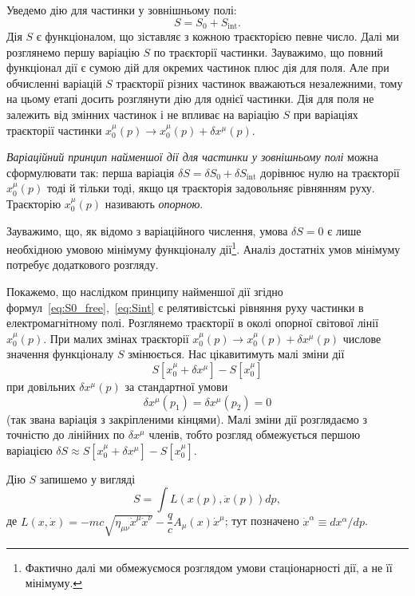 Уведемо дію для частинки у зовнішньому полі:
\begin{equation*}
    S = S_0 + S_{\text{int}}.
\end{equation*}
Дія $S$ є функціоналом, що зіставляє з кожною траєкторією певне число. Далі ми розглянемо першу варіацію $S$ по траєкторії частинки. Зауважимо, що повний функціонал дії є сумою дій для окремих частинок плюс дія для поля. Але при обчисленні варіацій $S$ траєкторії різних частинок вважаються незалежними, тому на цьому етапі досить розглянути дію для однієї частинки. Дія для поля не залежить від змінних частинок і не впливає на варіацію $S$ при варіаціях траєкторії частинки $x_0^{\mu}(p)\to x_0^{\mu}(p)+\delta x^{\mu}(p)$.

\emph{Варіаційний принцип найменшої дії для частинки у зовнішньому полі} можна сформулювати так: перша варіація $\delta S=\delta S_0+\delta S_{\text{int}}$ дорівнює нулю на траєкторії $x_0^{\mu}(p)$ тоді й тільки тоді, якщо ця траєкторія задовольняє рівнянням руху. Траєкторію $x_0^{\mu}(p)$ називають \emph{опорною}.

Зауважимо, що, як відомо з варіаційного числення, умова $\delta S=0$ є лише необхідною умовою мінімуму функціоналу дії\footnote{Фактично далі ми обмежуємося розглядом умови стаціонарності дії, а не її мінімуму.}. Аналіз достатніх умов мінімуму потребує додаткового розгляду.

Покажемо, що наслідком принципу найменшої дії згідно формул~\eqref{eq:S0_free},~\eqref{eq:Sint} є релятивістські рівняння руху частинки в електромагнітному полі. Розглянемо траєкторії в околі опорної світової лінії $x_0^{\mu}(p)$. При малих змінах траєкторії $x_0^{\mu}(p)\to x_0^{\mu}(p)+\delta x^{\mu}(p)$ числове значення функціоналу $S$ змінюється. Нас цікавитимуть малі зміни дії
\begin{equation*}
    S\!\left[x_0^{\mu}+\delta x^{\mu}\right] - S\!\left[x_0^{\mu}\right]
\end{equation*}
при довільних $\delta x^{\mu}(p)$ за стандартної умови
\begin{equation}\label{eq:fixed_ends}
    \delta x^{\mu}(p_1) = \delta x^{\mu}(p_2) = 0
\end{equation}
(так звана варіація з закріпленими кінцями). Малі зміни дії розглядаємо з точністю до лінійних по $\delta x^{\mu}$ членів, тобто розгляд обмежується першою варіацією $\delta S \approx S[x_0^{\mu}+\delta x^{\mu}]-S[x_0^{\mu}]$.

Дію $S$ запишемо у вигляді
\begin{equation*}
    S = \int L\!\left(x(p),\dot{x}(p)\right)dp,
\end{equation*}
де $L(x,\dot{x}) = -mc\sqrt{\eta_{\mu\nu}\dot{x}^{\mu}\dot{x}^{\nu}} - \dfrac{q}{c}A_{\mu}(x)\dot{x}^{\mu}$; тут позначено $\dot{x}^{\alpha}\equiv dx^{\alpha}/dp$.

